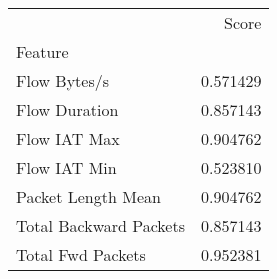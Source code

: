 \begin{tabular}{lr}
\toprule
{} &     Score \\
Feature                &           \\
\midrule
Flow Bytes/s           &  0.571429 \\
Flow Duration          &  0.857143 \\
Flow IAT Max           &  0.904762 \\
Flow IAT Min           &  0.523810 \\
Packet Length Mean     &  0.904762 \\
Total Backward Packets &  0.857143 \\
Total Fwd Packets      &  0.952381 \\
\bottomrule
\end{tabular}
